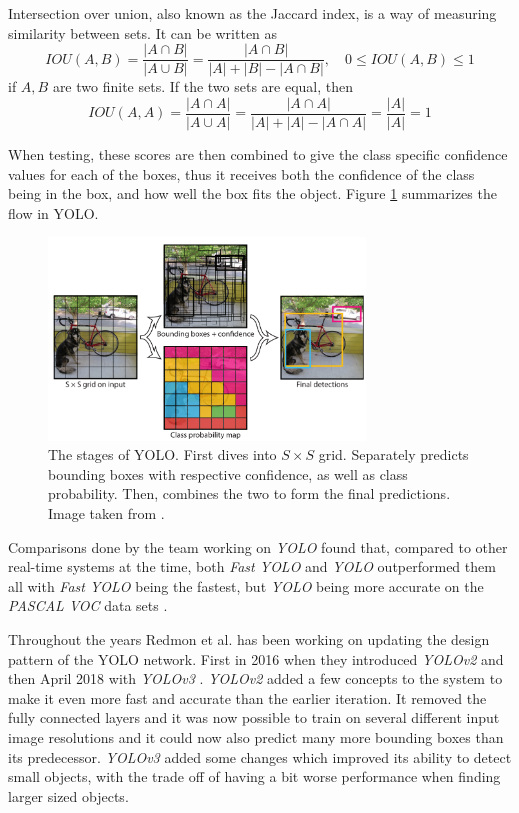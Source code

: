 Intersection over union, also known as the Jaccard index, is a way of measuring similarity between sets. It can be written as 
 \[
IOU(A,B) =  \frac{|A\cap B |}{|A\cup B|} =\frac{|A\cap B|}{|A| + |B| - |A \cap B|}
, \quad 0\leq IOU(A,B) \leq 1
 \]
 if $A,B$ are two finite sets. If the two sets are equal, then \[ IOU(A,A) =  \frac{|A\cap A |}{|A\cup A|} = \frac{|A\cap A|}{|A| + |A| - |A \cap A|}  = \frac{|A|}{|A|} = 1 \]
 
 When testing, these scores are then combined to give the class specific confidence values for each of the boxes, thus it receives both the confidence of the class being in the box, and how well the box fits the object. Figure \ref{fig:YOLO_stages} summarizes the flow in YOLO. 
\begin{figure}[hbtp]
\begin{center}
\includegraphics[width = 0.75\textwidth]{./Images/YOLO_stages.PNG} 
\caption{The stages of YOLO. First dives into $S \times S$ grid. Separately predicts bounding boxes with respective confidence, as well as class probability. Then, combines the two to form the final predictions. Image taken from \cite{YOLO1}.}
\label{fig:YOLO_stages}
\end{center}
\end{figure}

Comparisons done by the team working on \textit{YOLO} found that, compared to other real-time systems at the time, both \textit{Fast YOLO} and \textit{YOLO} outperformed them all with \textit{Fast YOLO} being the fastest, but \textit{YOLO} being more accurate on the \textit{PASCAL VOC} data sets \cite{PASCAL}.

Throughout the years Redmon et al. has been working on updating the design pattern of the 
YOLO network. First in 2016 when they introduced \textit{YOLOv2} and then April 2018 with \textit{YOLOv3} \cite{YOLO2}\cite{YOLO3}. \textit{YOLOv2} added a few concepts to the system to make it even more fast and accurate than the earlier iteration. It removed the fully connected layers and it was now possible to train on several different input image resolutions and it could now also predict many more bounding boxes than its predecessor. \textit{YOLOv3} added some changes which improved its ability to detect small objects, with the trade off of having a bit worse performance when finding larger sized objects.  

